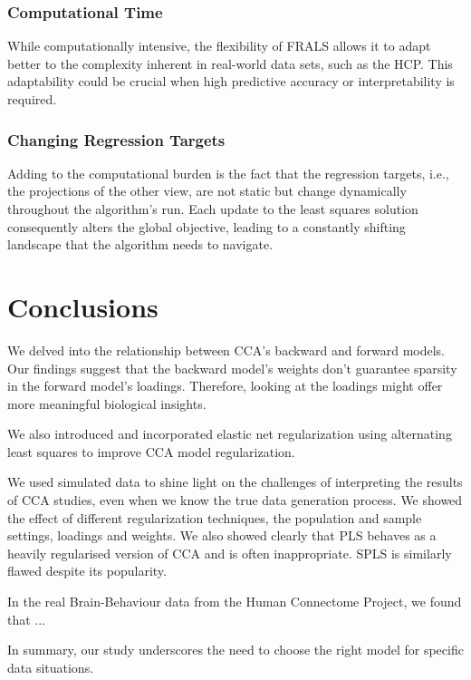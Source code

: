 \subsubsection{Computational Time}\label{subsec:computational-time}
While computationally intensive, the flexibility of FRALS allows it to adapt better to the complexity inherent in real-world data sets, such as the HCP. This adaptability could be crucial when high predictive accuracy or interpretability is required.

\subsubsection{Changing Regression Targets}\label{subsec:changing-regression-targets}
Adding to the computational burden is the fact that the regression targets, i.e., the projections of the other view, are not static but change dynamically throughout the algorithm's run.
Each update to the least squares solution consequently alters the global objective, leading to a constantly shifting landscape that the algorithm needs to navigate.

\section{Conclusions}

We delved into the relationship between CCA's backward and forward models.
Our findings suggest that the backward model's weights don't guarantee sparsity in the forward model's loadings.
Therefore, looking at the loadings might offer more meaningful biological insights.

We also introduced and incorporated elastic net regularization using alternating least squares to improve CCA model regularization.

We used simulated data to shine light on the challenges of interpreting the results of CCA studies, even when we know the true data generation process.
We showed the effect of different regularization techniques, the population and sample settings, loadings and weights.
We also showed clearly that PLS behaves as a heavily regularised version of CCA and is often inappropriate.
SPLS is similarly flawed despite its popularity.

In the real Brain-Behaviour data from the Human Connectome Project, we found that ...

In summary, our study underscores the need to choose the right model for specific data situations.